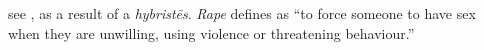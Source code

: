 \item[Rape,]

see , as a result of a \emph{hybristēs}. \emph{Rape} defines as ``to force someone to have sex when they are unwilling, using violence or threatening behaviour.''
